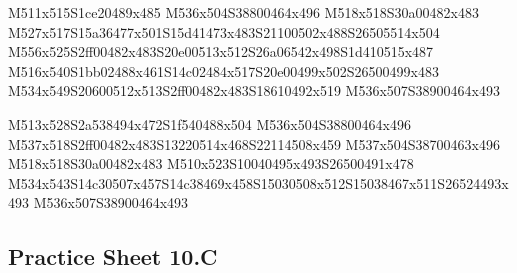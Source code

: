 \documentclass{article}
\begin{document}
\begin{multicols}{5}
\begin{center}
M511x515S1ce20489x485 %
M536x504S38800464x496 %
M518x518S30a00482x483 %
M527x517S15a36477x501S15d41473x483S21100502x488S26505514x504 %
M556x525S2ff00482x483S20e00513x512S26a06542x498S1d410515x487 %
M516x540S1bb02488x461S14c02484x517S20e00499x502S26500499x483 %
M534x549S20600512x513S2ff00482x483S18610492x519 %
M536x507S38900464x493 %
\vfil
\columnbreak

M513x528S2a538494x472S1f540488x504 %
M536x504S38800464x496 %
M537x518S2ff00482x483S13220514x468S22114508x459 %
M537x504S38700463x496 %
M518x518S30a00482x483 %
M510x523S10040495x493S26500491x478 %
M534x543S14c30507x457S14c38469x458S15030508x512S15038467x511S26524493x493 %
M536x507S38900464x493 %
\vfil

\end{center}
\end{multicols}

\subsection{Practice Sheet 10.C}
\end{document}
